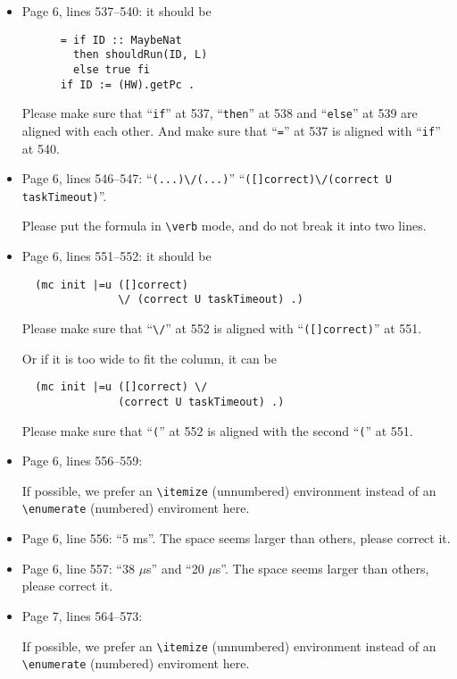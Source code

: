 \documentclass[12pt,onecolumn]{IEEEtranTIE}
\begin{document}
\begin{itemize}
\item Page 6, lines 537--540: it should be
\begin{verbatim}
      = if ID :: MaybeNat 
        then shouldRun(ID, L)
        else true fi
      if ID := (HW).getPc .
\end{verbatim}

Please make sure that ``\verb|if|'' at 537, ``\verb|then|'' at 538 and
``\verb|else|'' at 539 are aligned with each other.  And make sure
that ``\verb|=|'' at 537 is aligned with ``\verb|if|'' at 540.


\item Page 6, lines 546--547: ``\verb|(...)\/(...)|'' \by
  ``\verb|([]correct)\/(correct U taskTimeout)|''.

Please put the formula in \verb|\verb| mode, and do not break it into
two lines.


\item Page 6, lines 551--552: it should be
\begin{verbatim}
  (mc init |=u ([]correct) 
               \/ (correct U taskTimeout) .)
\end{verbatim}

Please make sure that ``\verb|\/|'' at 552 is aligned with
``\verb|([]correct)|'' at 551.

Or if it is too wide to fit the column, it can be
\begin{verbatim}
  (mc init |=u ([]correct) \/ 
               (correct U taskTimeout) .)
\end{verbatim}

Please make sure that ``\verb|(|'' at 552 is aligned with the second
``\verb|(|'' at 551.


\item Page 6, lines 556--559:

If possible, we prefer an \verb|\itemize| (unnumbered) environment
instead of an \verb|\enumerate| (numbered) enviroment here.

\item Page 6, line 556: ``5 ms''. The space seems larger than others,
  please correct it.

\item Page 6, line 557: ``38 $\mu$s'' and ``20 $\mu$s''. The space
  seems larger than others, please correct it.

\item Page 7, lines 564--573:

If possible, we prefer an \verb|\itemize| (unnumbered) environment
instead of an \verb|\enumerate| (numbered) enviroment here.


\end{itemize}
\end{document}
